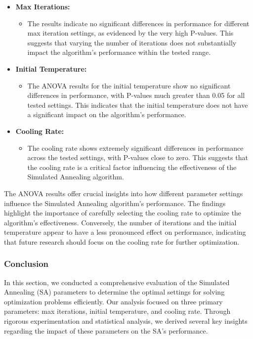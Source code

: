 \documentclass[
]{article}
\begin{document}
    \begin{itemize}
        \item \textbf{Max Iterations:}
        \begin{itemize}
            \item The results indicate no significant differences in performance for different max iteration settings, as evidenced by the very high P-values. This suggests that varying the number of iterations does not substantially impact the algorithm's performance within the tested range.
        \end{itemize}
        \item \textbf{Initial Temperature:}
        \begin{itemize}
            \item The ANOVA results for the initial temperature show no significant differences in performance, with P-values much greater than 0.05 for all tested settings. This indicates that the initial temperature does not have a significant impact on the algorithm's performance.
        \end{itemize}
        \item \textbf{Cooling Rate:}
        \begin{itemize}
            \item The cooling rate shows extremely significant differences in performance across the tested settings, with P-values close to zero. This suggests that the cooling rate is a critical factor influencing the effectiveness of the Simulated Annealing algorithm.
        \end{itemize}
    \end{itemize}

    The ANOVA results offer crucial insights into how different parameter settings influence the Simulated Annealing algorithm's performance. The findings highlight the importance of carefully selecting the cooling rate to optimize the algorithm's effectiveness. Conversely, the number of iterations and the initial temperature appear to have a less pronounced effect on performance, indicating that future research should focus on the cooling rate for further optimization.

    \subsubsection{Conclusion}

    In this section, we conducted a comprehensive evaluation of the Simulated Annealing (SA) parameters to determine the optimal settings for solving optimization problems efficiently. Our analysis focused on three primary parameters: max iterations, initial temperature, and cooling rate. Through rigorous experimentation and statistical analysis, we derived several key insights regarding the impact of these parameters on the SA's performance.
\end{document}
